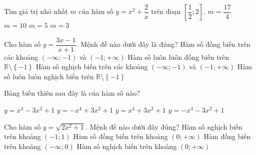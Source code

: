 \begin{ex}%
Tìm giá trị nhỏ nhất $m$ của hàm số $y=x^{2}+\dfrac{2}{x}$ trên đoạn $\left[\dfrac{1}{2};2\right]$.
\choice
{$m=\dfrac{17}{4}$}
{$m=10$}
{$m=5$}
{\True $m=3$}
\end{ex}

\begin{ex}%
Cho hàm số $y=\dfrac{3x-1}{x+1}$. Mệnh đề nào dưới đây là đúng?
\choice
{\True Hàm số đồng biến trên các khoảng $\left(-\infty;-1\right)$ và $\left(-1;+\infty\right)$}
{Hàm số luôn luôn đồng biến trên $\mathbb{R}\setminus \left\{-1\right\}$}
{Hàm số nghịch biến trên các khoảng $\left(-\infty;-1\right)$ và $\left(-1;+\infty\right)$}
{Hàm số luôn luôn nghịch biến trên $\mathbb{R}\setminus \left\{-1\right\}$}
\end{ex}

\begin{ex}%
Bảng biến thiên sau đây là của hàm số nào?
\begin{center}
\end{center}
\choice
{$y=x^4-3x^2+1$}
{$y=-x^4+3x^2+1$}
{\True $y=x^4+3x^2+1$}
{$y=-x^4-3x^2+1$}
\end{ex}

\begin{ex}%
Cho hàm số $y=\sqrt{2x^{2}+1}$. Mệnh đề nào dưới đây đúng?
\choice
{Hàm số nghịch biến trên khoảng $\left(-1;1\right)$}
{\True Hàm số đồng biến trên khoảng $\left(0;+\infty\right)$}
{Hàm đồng biến trên khoảng $\left(-\infty;0\right)$}
{Hàm số nghịch biến trên khoảng $\left(0;+\infty\right)$}
\end{ex}

